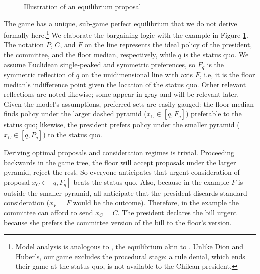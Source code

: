 \documentclass[letter,12pt]{article}
\begin{document}
\begin{figure}
  \centering
  \caption{Illustration of an equilibrium proposal}\label{F:example}
\end{figure}

The game has a unique, sub-game perfect equilibrium that we do not derive formally here.\footnote{Model analysis is analogous to \citet{dion.huber.1996}, the equilibrium akin to \citet{magar.nd,romer.rosenthal.1978,cox.mccubbins.2005,gerber.1996}. Unlike Dion and Huber's, our game excludes the procedural stage: a rule denial, which ends their game at the status quo, is not available to the Chilean president.} We elaborate the bargaining logic with the example in Figure \ref{F:example}. The notation $P$, $C$, and $F$ on the line represents the ideal policy of the president, the committee, and the floor median, respectively, while $q$ is the status quo. We assume Euclidean single-peaked and symmetric preferences, so $F_q$ is the symmetric reflection of $q$ on the unidimensional line with axis $F$, i.e, it is the floor median's indifference point given the location of the status quo. Other relevant reflections are noted likewise; some appear in gray and will be relevant later. Given the model's assumptions, preferred sets are easily gauged: the floor median finds policy under the larger dashed pyramid ($x_C \in [q,F_q]$) preferable to the status quo; likewise, the president prefers policy under the smaller pyramid ($x_C \in [q,P_q]$) to the status quo. 

Deriving optimal proposals and consideration regimes is trivial. Proceeding backwards in the game tree, the floor will accept proposals under the larger pyramid, reject the rest. So everyone anticipates that urgent consideration of proposal $x_C \in [q,F_q]$ beats the status quo. Also, because in the example $F$ is outside the smaller pyramid, all anticipate that the president discards standard consideration ($x_F=F$ would be the outcome). Therefore, in the example the committee can afford to send $x_C=C$. The president declares the bill urgent because she prefers the committee version of the bill to the floor's version. 
\end{document}
